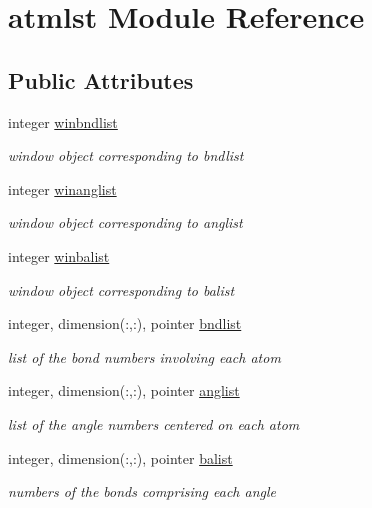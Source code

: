 \hypertarget{classatmlst}{\section{atmlst Module Reference}
\label{classatmlst}
}
\subsection*{Public Attributes}
\begin{DoxyCompactItemize}
\item 
integer \hyperlink{classatmlst_a960c43f79324985305533ec872e970d4}{winbndlist}
\begin{DoxyCompactList}\small\item\em window object corresponding to bndlist \end{DoxyCompactList}\item 
integer \hyperlink{classatmlst_ad4e86e855fb683fa5fc99d128e30b344}{winanglist}
\begin{DoxyCompactList}\small\item\em window object corresponding to anglist \end{DoxyCompactList}\item 
integer \hyperlink{classatmlst_ab14088e45057cf6a5761d15903693729}{winbalist}
\begin{DoxyCompactList}\small\item\em window object corresponding to balist \end{DoxyCompactList}\item 
integer, dimension(\-:,\-:), pointer \hyperlink{classatmlst_a9137df3d6e7537ac04cb92835864b79d}{bndlist}
\begin{DoxyCompactList}\small\item\em list of the bond numbers involving each atom \end{DoxyCompactList}\item 
integer, dimension(\-:,\-:), pointer \hyperlink{classatmlst_ad232b9a788fe93379e9d80d30d8666ff}{anglist}
\begin{DoxyCompactList}\small\item\em list of the angle numbers centered on each atom \end{DoxyCompactList}\item 
integer, dimension(\-:,\-:), pointer \hyperlink{classatmlst_a7a0a8658bb6a68244435c4cbb82b34f2}{balist}
\begin{DoxyCompactList}\small\item\em numbers of the bonds comprising each angle \end{DoxyCompactList}\item 

\end{DoxyCompactItemize}
